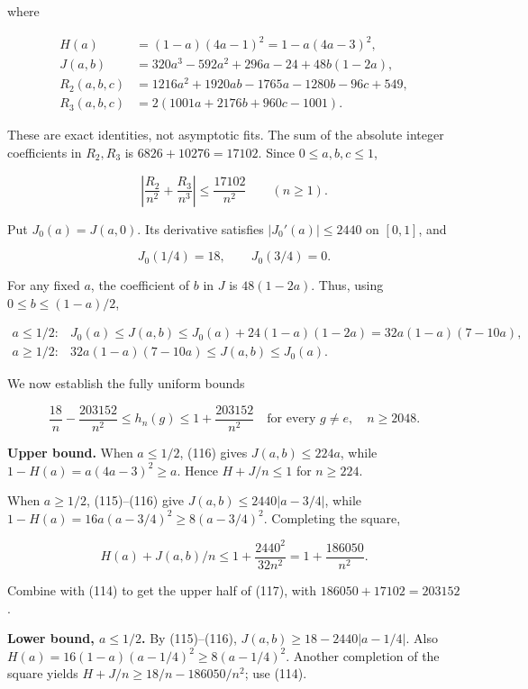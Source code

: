 \documentclass[
  11pt,
]{article}
\begin{document}
where

\[
\begin{aligned}
H(a)&=(1-a)(4a-1)^2
     =1-a(4a-3)^2,\\
J(a,b)&=320a^3-592a^2+296a-24+48b(1-2a),\\
R_2(a,b,c)&=1216a^2+1920ab-1765a-1280b-96c+549,\\
R_3(a,b,c)&=2(1001a+2176b+960c-1001).
\end{aligned} \tag{113}
\]

These are exact identities, not asymptotic fits. The sum of the absolute
integer coefficients in \(R_2,R_3\) is \(6826+10276=17102\). Since
\(0\le a,b,c\le1\),

\[
\left|\frac{R_2}{n^2}+\frac{R_3}{n^3}\right|
\le\frac{17102}{n^2}
\qquad(n\ge1). \tag{114}
\]

Put \(J_0(a)=J(a,0)\). Its derivative satisfies \(|J_0'(a)|\le2440\) on
\([0,1]\), and

\[
J_0(1/4)=18,\qquad J_0(3/4)=0.
\tag{115}
\]

For any fixed \(a\), the coefficient of \(b\) in \(J\) is \(48(1-2a)\).
Thus, using \(0\le b\le(1-a)/2\),

\[
\begin{array}{ll}
a\le1/2:&
J_0(a)\le J(a,b)\le J_0(a)+24(1-a)(1-2a)
=32a(1-a)(7-10a),\\[2pt]
a\ge1/2:&
32a(1-a)(7-10a)\le J(a,b)\le J_0(a).
\end{array} \tag{116}
\]

We now establish the fully uniform bounds

\[
\frac{18}{n}-\frac{203152}{n^2}
\le h_n(g)\le
1+\frac{203152}{n^2}
\quad\text{for every }g\ne e,\quad n\ge2048. \tag{117}
\]

\textbf{Upper bound.} When \(a\le1/2\), (116) gives \(J(a,b)\le224a\),
while \(1-H(a)=a(4a-3)^2\ge a\). Hence \(H+J/n\le1\) for \(n\ge224\).

When \(a\ge1/2\), (115)--(116) give \(J(a,b)\le2440|a-3/4|\), while
\(1-H(a)=16a(a-3/4)^2\ge8(a-3/4)^2\). Completing the square,

\[
H(a)+J(a,b)/n\le
1+\frac{2440^2}{32n^2}
=1+\frac{186050}{n^2}.
\]

Combine with (114) to get the upper half of (117), with
\(186050+17102=203152\).

\textbf{Lower bound, \(a\le1/2\).} By (115)--(116),
\(J(a,b)\ge18-2440|a-1/4|\). Also
\(H(a)=16(1-a)(a-1/4)^2\ge8(a-1/4)^2\). Another completion of the square
yields \(H+J/n\ge18/n-186050/n^2\); use (114).
\end{document}
